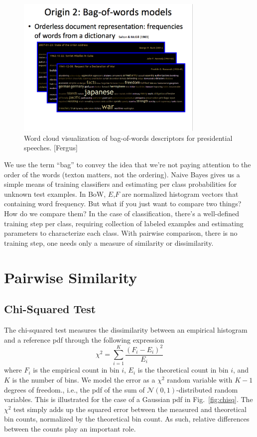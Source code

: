 \documentclass[a4paper]{article}
\begin{document}
\begin{figure}
\centering
\includegraphics[width=0.8\textwidth]{fig5_fergus.png}
\caption{\label{fig:wordcloud}Word cloud visualization of bag-of-words descriptors for presidential speeches. [Fergus]}
\end{figure}

We use the term ``bag'' to convey the idea that we're not paying attention to the order of the words (texton matters, not the ordering).  Naive Bayes gives us a simple means of training classifiers and estimating per class probabilities for unknown test examples. In BoW, $E$,$F$ are normalized histogram vectors that containing word frequency. 
But what if you just want to compare two things?  How do we compare them? In the case of classification, there's a well-defined training step per class, requiring collection of labeled examples and estimating parameters to characterize each class.  With pairwise comparison, there is no training step, one needs only a measure of similarity or dissimilarity.  

\section{Pairwise Similarity}

\subsection{Chi-Squared Test}
The chi-squared test measures the dissimilarity between an empirical histogram and a reference pdf through the following expression
$$
\chi^2 = \sum_{i=1}^{K} \frac{(F_i - E_i)^2}{E_i}
$$
where $F_i$ is the empirical count in bin $i$, $E_i$ is the theoretical count in bin $i$, and $K$ is the number of bins.  We model the error as a $\chi^2$ random variable with $K-1$ degrees of freedom., i.e., the pdf of the sum of $\mathcal{N}(0,1)$-distributed random variables.  This is illustrated for the case of a Gaussian pdf in Fig.\ \ref{fig:chisq}.  The $\chi^2$ test simply adds up the squared error between the measured and theoretical bin counts, normalized by the theoretical bin count.  As such, relative differences between the counts play an important role.
\end{document}
